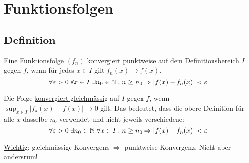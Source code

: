 \section{Funktionsfolgen}
\subsection{Definition}
Eine Funktionsfolge $(f_n)$ \underline{konvergiert punktweise} auf dem
Definitionsbereich $I$ gegen $f$, wenn für jedes $x \in I$ gilt $f_n(x) \to f(x)$.
\[
\forall \varepsilon > 0 \; \forall x \in I \; \exists n_0 \in \mathbb{N}: n \geq n_0
\Rightarrow |f(x) - f_n(x)| < \varepsilon
\]

Die Folge \underline{konvergiert gleichmässig} auf $I$ gegen $f$, wenn
$\sup_{x\in I} |f_n(x) - f(x)| \to 0$ gilt. Das bedeutet, dass die obere
Definition für alle $x$ \underline{dasselbe} $n_0$ verwendet und nicht jeweils
verschiedene:
\[
\forall \varepsilon > 0 \; \exists n_0 \in \mathbb{N} \; \forall x \in I: n \geq n_0
\Rightarrow |f(x) - f_n(x)| < \varepsilon
\]

\underline{Wichtig}: gleichmässige Konvergenz $\Rightarrow$ punktweise
Konvergenz. Nicht aber andersrum!

